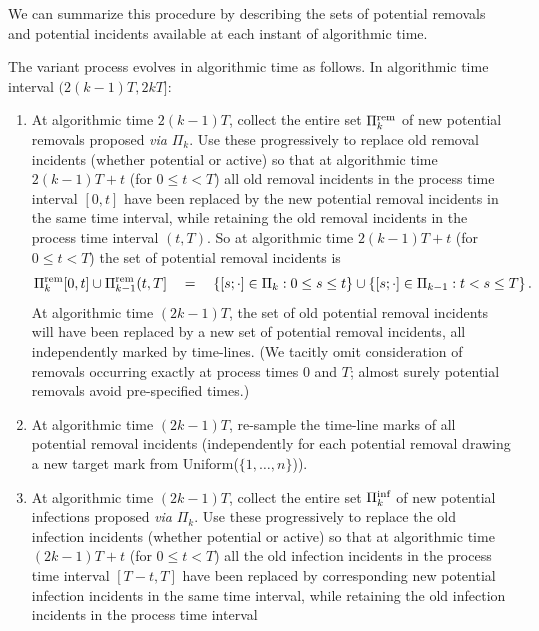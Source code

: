 \documentclass[]{article}
\newcommand{\Poisson}{\Pi}
\newcommand{\PoissonRem}{\Poisson^\textup{rem}}
\newcommand{\PoissonInf}{\Poisson^\textup{inf}}
\begin{document}
We can summarize this procedure by describing the sets of potential removals
and potential incidents available at each instant of algorithmic time.%
\begin{defn}
The variant process evolves in algorithmic time as follows.
\label{def:detailed}
In algorithmic time interval \((2(k{-}1)T, 2kT]\):
\begin{enumerate}
\item\label{item:detailed-removals}
At algorithmic time \(2(k{-}1)T\),
collect the entire set 
\(\PoissonRem_k\)
of new potential removals
 proposed \emph{via} \(\Pi_k\).
Use these progressively to replace
old removal incidents 
(whether potential or active)
so that  
at algorithmic time \(2(k{-}1)T+t\) (for \(0\leq t<T\))
all old removal incidents in the process time
interval \([0,t]\) have been replaced by 
the new potential removal incidents
in the same time interval, 
while retaining the old removal incidents 
in the process time interval 
\((t,T)\).
So at algorithmic time \(2(k{-}1)T+t\) (for \(0\leq t<T\)) the set of potential removal incidents is
\[
\PoissonRem_k[0,t] \cup \PoissonRem_{k-1}(t,T] \quad = \quad
\{[s;\cdot]\in\Poisson_k: 0\leq s\leq t\}
\cup
\{[s;\cdot]\in\Poisson_{k-1}: t<s\leq T \}
\,.
\]
At algorithmic time \((2k{-}1)T\), the set of old
potential removal incidents will have been replaced by a new set of
potential removal incidents, 
all
independently marked by time-lines.
(We tacitly omit consideration 
of removals occurring exactly at process times \(0\) and \(T\);
almost surely potential removals avoid pre-specified times.)
\item\label{item:detailed-re-mark-removals}
At algorithmic time \((2k{-}1)T\),
re-sample the time-line marks of
all potential removal incidents
(independently for each potential removal drawing a new target
mark from 
Uniform(\(\{1,\dots,n\}\))).
\item\label{item:detailed-infections}
At algorithmic time \((2k{-}1)T\),
collect the entire set
\(\PoissonInf_k\)
of new potential infections
proposed \emph{via} \(\Pi_k\).
Use these progressively to replace
the old infection incidents 
(whether potential or active)
so that  
at algorithmic time \((2k{-}1)T+t\) (for \(0\leq t<T\))
all the old infection incidents in the process time interval 
\([T{-}t,T]\) 
have been replaced by 
corresponding new potential infection incidents 
in the same time interval, 
while retaining the old infection incidents in the process time interval 

\end{enumerate}
\end{defn}
\end{document}
